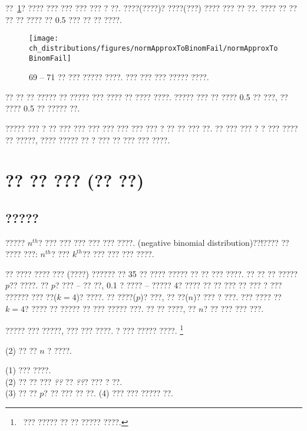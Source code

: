 ??~\ref{normApproxToBinomFail}? ???? ??? ??? ??? ??? ? ??. ????(????)? ????(???) ???? ??? ?? ??. ???? ?? ?? ?? ?? ???? ?? 0.5 ??? ?? ?? ????.

\begin{figure}[h]
\centering
\texttt{[image: ch\_distributions/figures/normApproxToBinomFail/normApproxToBinomFail]}
\caption{
69 -- 71 ?? ??? ????? ????. ??? ??? ??? ????? ????.}
\label{normApproxToBinomFail}
\end{figure}

\begin{tipBox}{
?? ?? ?? ????? ?? ????? ??? ???? ?? ???? ????. ????? ??? ?? ???? 0.5 ?? ???, ?? ???? 0.5 ?? ????? ??.}
\end{tipBox}

????? ??? ? ?? ??? ??? ??? ??? ??? ??? ??? ? ?? ?? ??? ??. ?? ??? ??? ? ? ??? ???? ?? ?????, ???? ????? ?? ? ??? ?? ??? ??? ????.




\section{?? ?? ??? (?? ??)}
\label{discreteModels}

\subsection{?????}
\label{negativeBinomial}

????? $n^{th}$? ??? ??? ??? ??? ??? ????. (negative binomial distribution){??!???}? ?? ???? ???: $n^{th}$? ??? $k^{th}$?? ??? ??? ??? ????.

\begin{example}{
?? ???? ???? ??? (????) ?????? ?? 35 ?? ???? ????? ?? ?? ??? ????. ?? ?? ?? ????? $p$?? ????. ?? $p$? ??? -- ?? ??, 0.1 ? ???? -- ????? 4? ???? ?? ?? ??? ?? ??? ? ??? ??????}
??? ??($k=4$)? ????. ?? ????($p$)? ???, ?? ??($n$)? ??? ? ???. ??? ???? ?? $k=4$? ???? ?? ????? ?? ??? ????? ???. ?? ?? ????, ?? $n$? ?? ??? ??? ???.
\end{example}

????? ??? ?????, ??? ??? ????. ? ??? ????? ????. \footnote{\pageref{isItBinomialTipBox}~??? ????? ?? ?? ????? ????.}

(2) ?? ?? $n$ ? ????. \\

\begin{tipBox}{
(1) ??? ????. \\
(2) ?? ?? ??? \emph{??} ?? \emph{??}? ??? ? ??. \\
(3) ?? ?? $p$? ?? ??? ?? ??.
(4) ??? ??? ????? ??.}
\end{tipBox}

